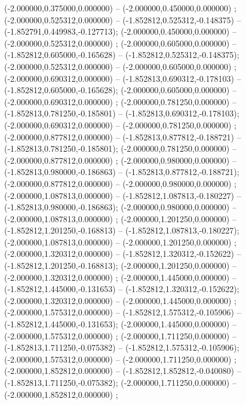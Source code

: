  (-2.000000,0.375000,0.000000) -- (-2.000000,0.450000,0.000000) ;
 (-2.000000,0.525312,0.000000) -- (-1.852812,0.525312,-0.148375) -- (-1.852791,0.449983,-0.127713);
 (-2.000000,0.450000,0.000000) -- (-2.000000,0.525312,0.000000) ;
 (-2.000000,0.605000,0.000000) -- (-1.852812,0.605000,-0.165628) -- (-1.852812,0.525312,-0.148375);
 (-2.000000,0.525312,0.000000) -- (-2.000000,0.605000,0.000000) ;
 (-2.000000,0.690312,0.000000) -- (-1.852813,0.690312,-0.178103) -- (-1.852812,0.605000,-0.165628);
 (-2.000000,0.605000,0.000000) -- (-2.000000,0.690312,0.000000) ;
 (-2.000000,0.781250,0.000000) -- (-1.852813,0.781250,-0.185801) -- (-1.852813,0.690312,-0.178103);
 (-2.000000,0.690312,0.000000) -- (-2.000000,0.781250,0.000000) ;
 (-2.000000,0.877812,0.000000) -- (-1.852813,0.877812,-0.188721) -- (-1.852813,0.781250,-0.185801);
 (-2.000000,0.781250,0.000000) -- (-2.000000,0.877812,0.000000) ;
 (-2.000000,0.980000,0.000000) -- (-1.852813,0.980000,-0.186863) -- (-1.852813,0.877812,-0.188721);
 (-2.000000,0.877812,0.000000) -- (-2.000000,0.980000,0.000000) ;
 (-2.000000,1.087813,0.000000) -- (-1.852812,1.087813,-0.180227) -- (-1.852813,0.980000,-0.186863);
 (-2.000000,0.980000,0.000000) -- (-2.000000,1.087813,0.000000) ;
 (-2.000000,1.201250,0.000000) -- (-1.852812,1.201250,-0.168813) -- (-1.852812,1.087813,-0.180227);
 (-2.000000,1.087813,0.000000) -- (-2.000000,1.201250,0.000000) ;
 (-2.000000,1.320312,0.000000) -- (-1.852812,1.320312,-0.152622) -- (-1.852812,1.201250,-0.168813);
 (-2.000000,1.201250,0.000000) -- (-2.000000,1.320312,0.000000) ;
 (-2.000000,1.445000,0.000000) -- (-1.852812,1.445000,-0.131653) -- (-1.852812,1.320312,-0.152622);
 (-2.000000,1.320312,0.000000) -- (-2.000000,1.445000,0.000000) ;
 (-2.000000,1.575312,0.000000) -- (-1.852812,1.575312,-0.105906) -- (-1.852812,1.445000,-0.131653);
 (-2.000000,1.445000,0.000000) -- (-2.000000,1.575312,0.000000) ;
 (-2.000000,1.711250,0.000000) -- (-1.852813,1.711250,-0.075382) -- (-1.852812,1.575312,-0.105906);
 (-2.000000,1.575312,0.000000) -- (-2.000000,1.711250,0.000000) ;
 (-2.000000,1.852812,0.000000) -- (-1.852812,1.852812,-0.040080) -- (-1.852813,1.711250,-0.075382);
 (-2.000000,1.711250,0.000000) -- (-2.000000,1.852812,0.000000) ;
